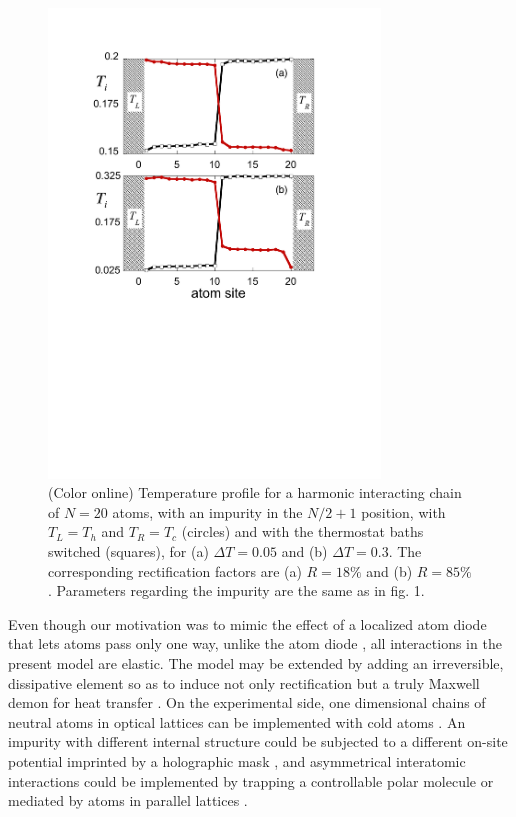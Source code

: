 \begin{figure}
\centering
\includegraphics[width=8.8cm]{Figures/FIG6.pdf}
\caption{(Color online) Temperature profile for a harmonic interacting chain of $N=20$ atoms, with an impurity in the $N/2+1$ position, with $T_L=T_h$ and $T_R=T_c$ (circles) and with the thermostat baths switched (squares), for (a) $\Delta T = 0.05$ and (b)  $\Delta T = 0.3$. The corresponding rectification factors are (a) $R=18\%$ and (b) $R=85\%$. Parameters regarding the impurity are the same as in fig. 1.
}
\label{figure6}
\end{figure}

Even though our motivation was to mimic the effect of a localized atom diode that lets atoms pass only one way,
unlike the atom diode \cite{Ruschhaupt2004}, all interactions in the present model
are elastic. The model may be extended by adding an irreversible,  dissipative element so as to induce not only rectification but a truly Maxwell demon for heat transfer \cite{Skordos1992,Ruschhaupt2006}.
On the experimental side, one dimensional chains of neutral atoms in optical lattices can be implemented with cold atoms \cite{Bloch2005}.
An impurity with different internal structure could be subjected to a different on-site potential imprinted by a holographic mask \cite{Bakr2009}, and asymmetrical interatomic interactions
could be implemented by trapping a controllable polar molecule or mediated by atoms in parallel lattices \cite{Gollub2014}.
